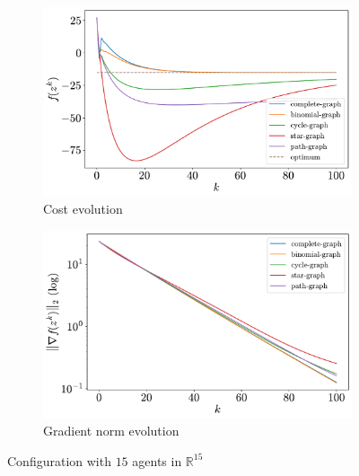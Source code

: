\documentclass[a4paper,11pt,oneside]{book}
\begin{document}
\begin{figure}[H]
      \centering
      \begin{subfigure}[t]{0.49\textwidth}
            \centering
            \includegraphics[width=\linewidth]{./figs/quadratic/cost_15_15_100.pdf} 
            \caption{Cost evolution}
      \end{subfigure}
      \hfill
      \begin{subfigure}[t]{0.49\textwidth}
            \centering
            \includegraphics[width=\linewidth]{./figs/quadratic/gradient_15_15_100.pdf} 
            \caption{Gradient norm evolution}
      \end{subfigure}
      \caption{Configuration with $15$ agents in $\mathbb{R}^{15}$}
\end{figure}
\end{document}
